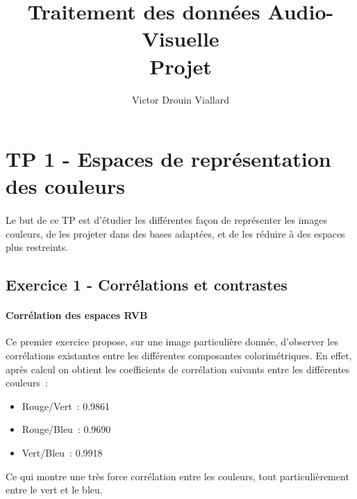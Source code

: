 \documentclass{article}
\title{Traitement des données Audio-Visuelle\\Projet}
\author{Victor Drouin Viallard}
\begin{document}
\maketitle
\clearpage
\tableofcontents
\clearpage

\section{TP 1 - Espaces de représentation des couleurs}
\paragraph{}
Le but de ce TP est d'étudier les différentes façon de représenter les images couleurs, de les projeter dans des bases adaptées, et de les réduire à des espaces plus restreints.
\subsection{Exercice 1 - Corrélations et contrastes}
\paragraph{Corrélation des espaces RVB}
Ce premier exercice propose, sur une image particulière donnée, d'observer les corrélations existantes entre les différentes composantes colorimétriques. En effet, après calcul on obtient les coefficients de corrélation suivants entre les différentes couleurs~:
\begin{itemize}
    \item Rouge/Vert~: 0.9861
    \item Rouge/Bleu~: 0.9690
    \item Vert/Bleu~: 0.9918
\end{itemize}
Ce qui montre une très force corrélation entre les couleurs, tout particulièrement entre le vert et le bleu.
\end{document}
